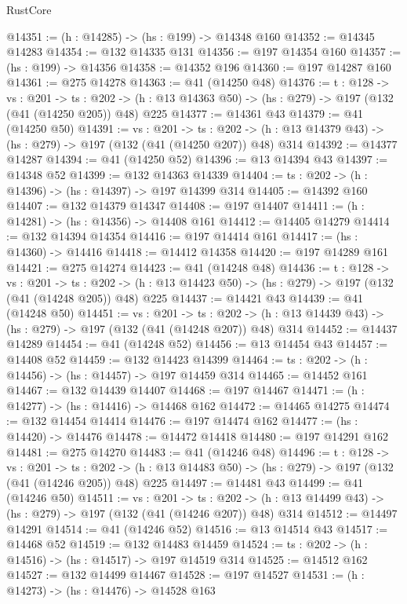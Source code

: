 \begin{lexlean}{RustCore}
\begin{coremodule}
@14351 := (h : @14285) -> (hs : @199) -> @14348 @160
@14352 := @14345 @14283
@14354 := @132 @14335 @131
@14356 := @197 @14354 @160
@14357 := (hs : @199) -> @14356
@14358 := @14352 @196
@14360 := @197 @14287 @160
@14361 := @275 @14278
@14363 := @41 (@14250 @48)
@14376 := {t : @128} ->
  {vs : @201} ->
  {ts : @202} -> (h : @13 @14363 @50) -> (hs : @279) -> @197 (@132 (@41 (@14250 @205)) @48) @225
@14377 := @14361 @43
@14379 := @41 (@14250 @50)
@14391 := {vs : @201} ->
  {ts : @202} -> (h : @13 @14379 @43) -> (hs : @279) -> @197 (@132 (@41 (@14250 @207)) @48) @314
@14392 := @14377 @14287
@14394 := @41 (@14250 @52)
@14396 := @13 @14394 @43
@14397 := @14348 @52
@14399 := @132 @14363 @14339
@14404 := {ts : @202} -> (h : @14396) -> (hs : @14397) -> @197 @14399 @314
@14405 := @14392 @160
@14407 := @132 @14379 @14347
@14408 := @197 @14407
@14411 := (h : @14281) -> (hs : @14356) -> @14408 @161
@14412 := @14405 @14279
@14414 := @132 @14394 @14354
@14416 := @197 @14414 @161
@14417 := (hs : @14360) -> @14416
@14418 := @14412 @14358
@14420 := @197 @14289 @161
@14421 := @275 @14274
@14423 := @41 (@14248 @48)
@14436 := {t : @128} ->
  {vs : @201} ->
  {ts : @202} -> (h : @13 @14423 @50) -> (hs : @279) -> @197 (@132 (@41 (@14248 @205)) @48) @225
@14437 := @14421 @43
@14439 := @41 (@14248 @50)
@14451 := {vs : @201} ->
  {ts : @202} -> (h : @13 @14439 @43) -> (hs : @279) -> @197 (@132 (@41 (@14248 @207)) @48) @314
@14452 := @14437 @14289
@14454 := @41 (@14248 @52)
@14456 := @13 @14454 @43
@14457 := @14408 @52
@14459 := @132 @14423 @14399
@14464 := {ts : @202} -> (h : @14456) -> (hs : @14457) -> @197 @14459 @314
@14465 := @14452 @161
@14467 := @132 @14439 @14407
@14468 := @197 @14467
@14471 := (h : @14277) -> (hs : @14416) -> @14468 @162
@14472 := @14465 @14275
@14474 := @132 @14454 @14414
@14476 := @197 @14474 @162
@14477 := (hs : @14420) -> @14476
@14478 := @14472 @14418
@14480 := @197 @14291 @162
@14481 := @275 @14270
@14483 := @41 (@14246 @48)
@14496 := {t : @128} ->
  {vs : @201} ->
  {ts : @202} -> (h : @13 @14483 @50) -> (hs : @279) -> @197 (@132 (@41 (@14246 @205)) @48) @225
@14497 := @14481 @43
@14499 := @41 (@14246 @50)
@14511 := {vs : @201} ->
  {ts : @202} -> (h : @13 @14499 @43) -> (hs : @279) -> @197 (@132 (@41 (@14246 @207)) @48) @314
@14512 := @14497 @14291
@14514 := @41 (@14246 @52)
@14516 := @13 @14514 @43
@14517 := @14468 @52
@14519 := @132 @14483 @14459
@14524 := {ts : @202} -> (h : @14516) -> (hs : @14517) -> @197 @14519 @314
@14525 := @14512 @162
@14527 := @132 @14499 @14467
@14528 := @197 @14527
@14531 := (h : @14273) -> (hs : @14476) -> @14528 @163

\end{coremodule}
\end{lexlean}
